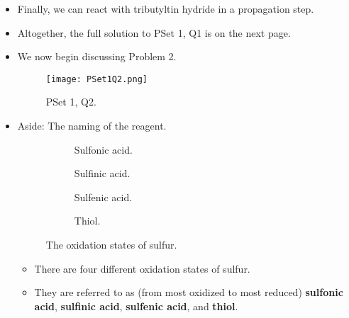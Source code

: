 \documentclass[../notes.tex]{subfiles}
\begin{document}
\begin{itemize}
    \item Finally, we can react with tributyltin hydride in a propagation step.
    \item Altogether, the full solution to PSet 1, Q1 is on the next page.
    
    \item We now begin discussing Problem 2.
    \begin{figure}[h!]
        \centering
        \texttt{[image: PSet1Q2.png]}
        \caption{PSet 1, Q2.}
        \label{fig:PSet1Q2}
    \end{figure}
    \item Aside: The naming of the reagent.
    \begin{figure}[h!]
        \centering
        \footnotesize
        \begin{subfigure}[b]{0.2\linewidth}
            \centering
            \caption{Sulfonic acid.}
            \label{fig:sulfurOxidationa}
        \end{subfigure}
        \begin{subfigure}[b]{0.2\linewidth}
            \centering
            \caption{Sulfinic acid.}
            \label{fig:sulfurOxidationb}
        \end{subfigure}
        \begin{subfigure}[b]{0.2\linewidth}
            \centering
            \caption{Sulfenic acid.}
            \label{fig:sulfurOxidationc}
        \end{subfigure}
        \begin{subfigure}[b]{0.2\linewidth}
            \centering
            \caption{Thiol.}
            \label{fig:sulfurOxidationd}
        \end{subfigure}
        \caption{The oxidation states of sulfur.}
        \label{fig:sulfurOxidation}
    \end{figure}
    \begin{itemize}
        \item There are four different oxidation states of sulfur.
        \item They are referred to as (from most oxidized to most reduced) \textbf{sulfonic acid}, \textbf{sulfinic acid}, \textbf{sulfenic acid}, and \textbf{thiol}.

\end{itemize}
\end{itemize}
\end{document}
